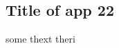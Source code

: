 \appendix

\begin{multicols}{2}	
	
	
		
	\section{Title of app 22}
	some thext theri
	\blankpage
	
\end{multicols}